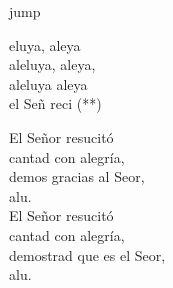 \begin{cancion}jump\\
	\begin{chorus}%
		eluya, aleya\\
		aleluya, aleya,\\
		aleluya aleya\\
		el Señ reci (**)  \jump\\
	\end{chorus}%
	\jump
El Señor resucitó\\
	\jump
cantad con alegría,\\
	demos gracias al Seor,\\
	alu.\\
	\jump
El Señor resucitó\\
	\jump
cantad con alegría,\\
	demostrad que es el Seor,\\
	alu.\\
\end{cancion}%
